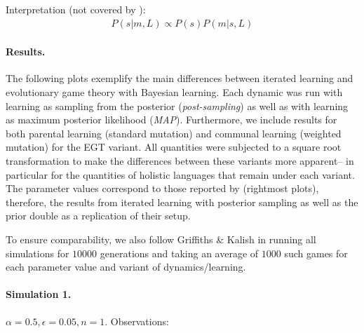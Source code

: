 \documentclass[12pt]{article}
\begin{document}
Interpretation (not covered by \citealt{griffiths+kalish:2007}):
\begin{align}
P(s|m,L) \propto P(s) P(m|s,L)
\end{align}

\paragraph{Results.} The following plots exemplify the main differences between iterated learning and evolutionary game theory with Bayesian learning. Each dynamic was run with learning as sampling from the posterior ({\em post-sampling}) as well as with learning as maximum posterior likelihood ({\em MAP}). Furthermore, we include results for both parental learning (standard mutation) and communal learning (weighted mutation) for the EGT variant. All quantities were subjected to a square root transformation to make the differences between these variants more apparent-- in particular for the quantities of holistic languages that remain under each variant. The parameter values correspond to those reported by \citealt[466]{griffiths+kalish:2007} (rightmost plots), therefore, the results from iterated learning with posterior sampling as well as the prior double as a replication of their setup.

To ensure comparability, we also follow Griffiths \& Kalish in running all simulations for $10000$ generations and taking an average of $1000$ such games for each parameter value and variant of dynamics/learning.

\paragraph{Simulation 1.} $\alpha = 0.5, \epsilon = 0.05, n = 1$. Observations: 
\end{document}
